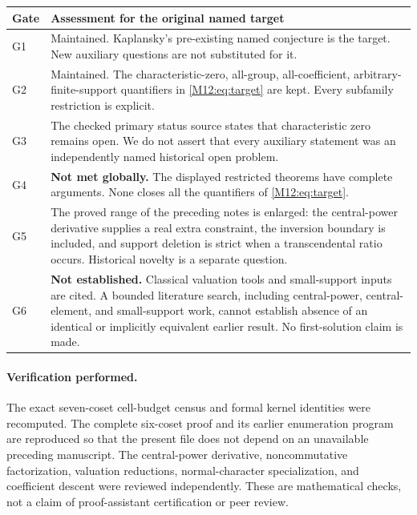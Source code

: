 \documentclass[11pt,a4paper,oneside]{report}
\theoremstyle{definition}
\theoremstyle{remark}
\begin{document}
\begin{center}
\small
\begin{tabular}{@{}l>{\raggedright\arraybackslash}p{.77\linewidth}@{}}
\toprule
Gate & Assessment for the original named target\\
\midrule
G1 & Maintained. Kaplansky's pre-existing named conjecture is the
target. New auxiliary questions are not substituted for it.\\[4pt]
G2 & Maintained. The characteristic-zero, all-group, all-coefficient,
arbitrary-finite-support quantifiers in \eqref{M12:eq:target} are kept.
Every subfamily restriction is explicit.\\[4pt]
G3 & The checked primary status source states that characteristic
zero remains open. We do not assert that every auxiliary statement
was an independently named historical open problem.\\[4pt]
G4 & \textbf{Not met globally.} The displayed restricted theorems
have complete arguments. None closes all the quantifiers of
\eqref{M12:eq:target}.\\[4pt]
G5 & The proved range of the preceding notes is enlarged: the
central-power derivative supplies a real extra constraint, the
inversion boundary is included, and support deletion is strict
when a transcendental ratio occurs. Historical novelty is a
separate question.\\[4pt]
G6 & \textbf{Not established.} Classical valuation tools and
small-support inputs are cited. A bounded literature search,
including central-power, central-element, and small-support work,
cannot establish absence of an identical or implicitly equivalent
earlier result. No first-solution claim is made.\\
\bottomrule
\end{tabular}
\end{center}

\paragraph{Verification performed.}
The exact seven-coset cell-budget census and formal kernel identities
were recomputed. The complete six-coset proof and its earlier
enumeration program are reproduced so that the present file does not
depend on an unavailable preceding manuscript. The central-power
derivative, noncommutative factorization, valuation reductions,
normal-character specialization, and coefficient descent were
reviewed independently. These are mathematical checks, not a claim
of proof-assistant certification or peer review.
\end{document}
